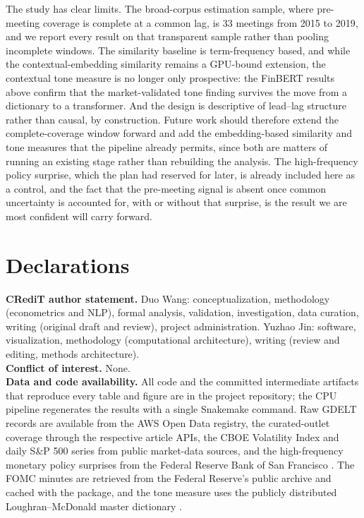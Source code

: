 \documentclass[11pt,a4paper]{article}
\begin{document}
The study has clear limits. The broad-corpus estimation sample, where pre-meeting
coverage is complete at a common lag, is 33 meetings from 2015 to 2019, and we
report every result on that transparent sample rather than pooling incomplete
windows. The similarity baseline is term-frequency based, and while the contextual-embedding
similarity remains a GPU-bound extension, the contextual tone measure is no longer
only prospective: the FinBERT results above confirm that the market-validated tone
finding survives the move from a dictionary to a transformer. And the design
is descriptive of lead--lag structure rather than causal, by construction. Future
work should therefore extend the complete-coverage window forward and add the
embedding-based similarity and tone measures that the pipeline already permits,
since both are matters of running an existing stage rather than rebuilding the
analysis. The high-frequency policy surprise, which the plan had reserved for later,
is already included here as a control, and the fact that the pre-meeting signal is
absent once common uncertainty is accounted for, with or without that surprise, is
the result we are most confident will carry forward.

\section*{Declarations}

\noindent\textbf{CRediT author statement.} Duo Wang: conceptualization, methodology
(econometrics and NLP), formal analysis, validation, investigation, data curation,
writing (original draft and review), project administration. Yuzhao Jin: software,
visualization, methodology (computational architecture), writing (review and
editing, methods architecture).\\
\noindent\textbf{Conflict of interest.} None.\\
\noindent\textbf{Data and code availability.} All code and the committed
intermediate artifacts that reproduce every table and figure are in the project
repository; the CPU pipeline regenerates the results with a single Snakemake
command. Raw GDELT records are available from the AWS Open Data registry, the
curated-outlet coverage through the respective article APIs, the CBOE Volatility
Index and daily S\&P 500 series from public market-data sources, and the
high-frequency monetary policy surprises from the Federal Reserve Bank of San
Francisco \citep{bauer2023reassessment}. The FOMC minutes are retrieved from the
Federal Reserve's public archive and cached with the package, and the tone measure
uses the publicly distributed Loughran--McDonald master dictionary
\citep{loughran2011liability}.



\end{document}
